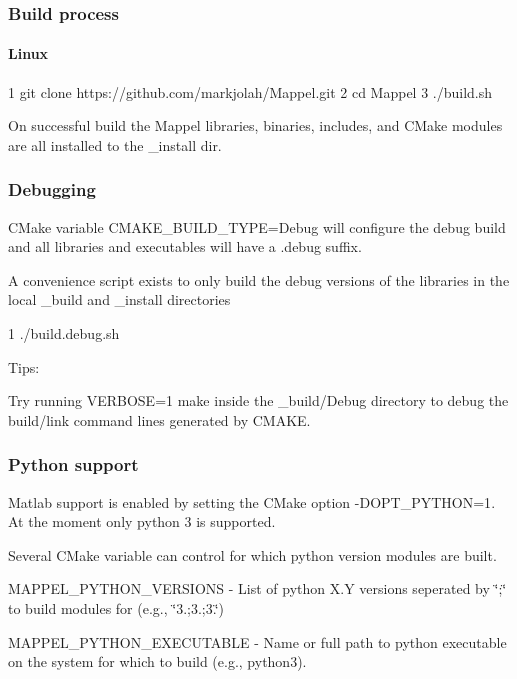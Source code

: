 \subsubsection*{Build process}

\paragraph*{Linux}


\begin{DoxyCode}
1 git clone https://github.com/markjolah/Mappel.git
2 cd Mappel
3 ./build.sh
\end{DoxyCode}
 On successful build the Mappel libraries, binaries, includes, and C\+Make modules are all installed to the {\ttfamily \+\_\+install} dir.

\subsubsection*{Debugging}

C\+Make variable {\ttfamily C\+M\+A\+K\+E\+\_\+\+B\+U\+I\+L\+D\+\_\+\+T\+Y\+PE=Debug} will configure the debug build and all libraries and executables will have a {\ttfamily .debug} suffix.

A convenience script exists to only build the debug versions of the libraries in the local {\ttfamily \+\_\+build} and {\ttfamily \+\_\+install} directories


\begin{DoxyCode}
1 ./build.debug.sh
\end{DoxyCode}
 Tips\+:
\begin{DoxyItemize}
\item Try running {\ttfamily V\+E\+R\+B\+O\+SE=1 make} inside the {\ttfamily \+\_\+build/\+Debug} directory to debug the build/link command lines generated by C\+M\+A\+KE.
\end{DoxyItemize}

\subsubsection*{Python support}

Matlab support is enabled by setting the C\+Make option {\ttfamily -\/\+D\+O\+P\+T\+\_\+\+P\+Y\+T\+H\+ON=1}. At the moment only python 3 is supported.

Several C\+Make variable can control for which python version modules are built.
\begin{DoxyItemize}
\item {\ttfamily M\+A\+P\+P\+E\+L\+\_\+\+P\+Y\+T\+H\+O\+N\+\_\+\+V\+E\+R\+S\+I\+O\+NS} -\/ List of python X.\+Y versions seperated by \char`\"{};\char`\"{} to build modules for (e.\+g., \char`\"{}3.;3.;3.\char`\"{})
\item {\ttfamily M\+A\+P\+P\+E\+L\+\_\+\+P\+Y\+T\+H\+O\+N\+\_\+\+E\+X\+E\+C\+U\+T\+A\+B\+LE} -\/ Name or full path to python executable on the system for which to build (e.\+g., python3).
\end{DoxyItemize}

